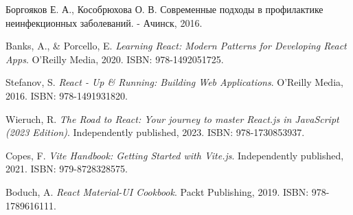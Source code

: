 \documentclass[a4paper,12pt]{article}
\begin{document}
	\newpage

	\begin{thebibliography}{99}

		 Боргояков Е. А., Кособрюхова О. В. Современные подходы в профилактике неинфекционных заболеваний. - Ачинск, 2016.

		Banks, A., \& Porcello, E.
		\textit{Learning React: Modern Patterns for Developing React Apps}.
		O'Reilly Media, 2020. ISBN: 978-1492051725.

		Stefanov, S.
		\textit{React - Up \& Running: Building Web Applications}.
		O'Reilly Media, 2016. ISBN: 978-1491931820.

		Wieruch, R.
		\textit{The Road to React: Your journey to master React.js in JavaScript (2023 Edition)}.
		Independently published, 2023. ISBN: 978-1730853937.

		Copes, F.
		\textit{Vite Handbook: Getting Started with Vite.js}.
		Independently published, 2021. ISBN: 979-8728328575.

		Boduch, A.
		\textit{React Material-UI Cookbook}.
		Packt Publishing, 2019. ISBN: 978-1789616111.

	\end{thebibliography}
\end{document}
